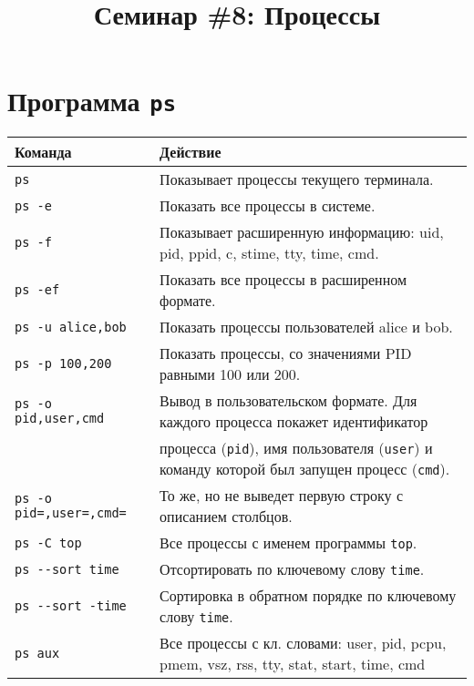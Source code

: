 \documentclass{article}
\begin{document}
\title{Семинар \#8: Процессы \vspace{-5ex}}\date{}\maketitle


\section*{Программа \texttt{ps}}




\begin{flushleft}
\begin{tabular}{ l | l }
Команда 	    	& Действие\\ \hline
\texttt{ps}	    	& Показывает процессы текущего терминала.\\
\texttt{ps -e}	    & Показать все процессы в системе.\\
\texttt{ps -f}	    & Показывает расширенную информацию: uid, pid, ppid, c, stime, tty, time, cmd.\\
\texttt{ps -ef}	    & Показать все процессы в расширенном формате.\\
\texttt{ps -u alice,bob} & Показать процессы пользователей alice и bob. \\
\texttt{ps -p 100,200} & Показать процессы, со значениями PID равными 100 или 200. \\ \hline
\texttt{ps -o pid,user,cmd} & Вывод в пользовательском формате. Для каждого процесса покажет идентификатор \\
                            & процесса (\texttt{pid}), имя пользователя (\texttt{user}) и команду которой был запущен процесс (\texttt{cmd}).\\
\texttt{ps -o pid=,user=,cmd=} & То же, но не выведет первую строку с описанием столбцов.\\
\texttt{ps -C top}             & Все процессы с именем программы \texttt{top}.\\
\texttt{ps -{}-sort time}        & Отсортировать по ключевому слову \texttt{time}.\\
\texttt{ps -{}-sort -time}       & Сортировка в обратном порядке по ключевому слову \texttt{time}.\\ \hline
\texttt{ps aux}                  & Все процессы с кл. словами: user, pid, pcpu, pmem, vsz, rss, tty, stat, start, time, cmd
\end{tabular}
\end{flushleft}
\end{document}
